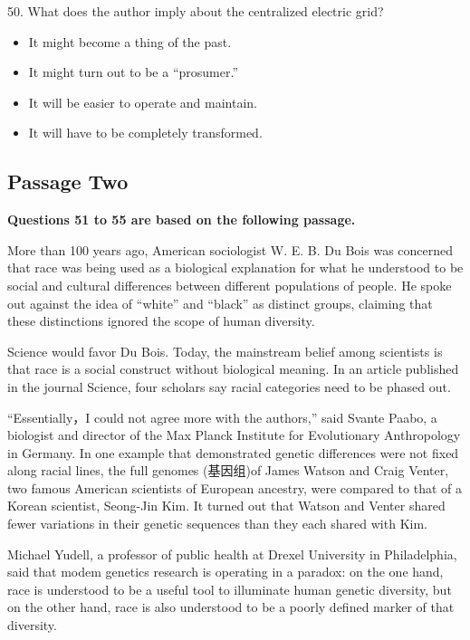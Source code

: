 \documentclass[UTF8,11pt]{ctexart}
\begin{document}
50. What does the author imply about the centralized electric grid?


\begin{itemize}[leftmargin=2em,itemsep=.2em,topsep=.4em]\item[A.] It might become a thing of the past.
\item[B.] It might turn out to be a “prosumer.”
\item[C.] It will be easier to operate and maintain.
\item[D.] It will have to be completely transformed.
\end{itemize}

\subsection*{\textbf{Passage Two}}


\textbf{Questions 51 to 55 are based on the following passage.}


More than 100 years ago, American sociologist W. E. B. Du Bois was concerned that race was being used as a biological explanation for what he understood to be social and cultural differences between different populations of people. He spoke out against the idea of “white” and “black” as distinct groups, claiming that these distinctions ignored the scope of human diversity.


Science would favor Du Bois. Today, the mainstream belief among scientists is that race is a social construct without biological meaning. In an article published in the journal Science, four scholars say racial categories need to be phased out.


“Essentially，I could not agree more with the authors,” said Svante Paabo, a biologist and director of the Max Planck Institute for Evolutionary Anthropology in Germany. In one example that demonstrated genetic differences were not fixed along racial lines, the full genomes (基因组)of James Watson and Craig Venter, two famous American scientists of European ancestry, were compared to that of a Korean scientist, Seong-Jin Kim. It turned out that Watson and Venter shared fewer variations in their genetic sequences than they each shared with Kim.


Michael Yudell, a professor of public health at Drexel University in Philadelphia, said that modem genetics research is operating in a paradox: on the one hand, race is understood to be a useful tool to illuminate human genetic diversity, but on the other hand, race is also understood to be a poorly defined marker of that diversity.
\end{document}
